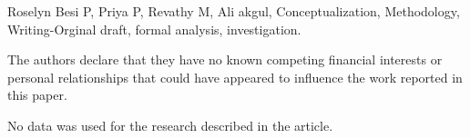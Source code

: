\documentclass[10pt]{NSP1}
\begin{document}
\par\medskip{}\smallskip

Roselyn Besi P, Priya P, Revathy M, Ali akgul, Conceptualization, Methodology, Writing-Orginal draft, formal analysis, investigation.

\par\medskip{}\smallskip

The authors declare that they have no known competing financial interests or personal relationships that could have appeared to influence the work reported in this paper.

\par\medskip{}\smallskip

No data was used for the research described in the article.
\end{document}
